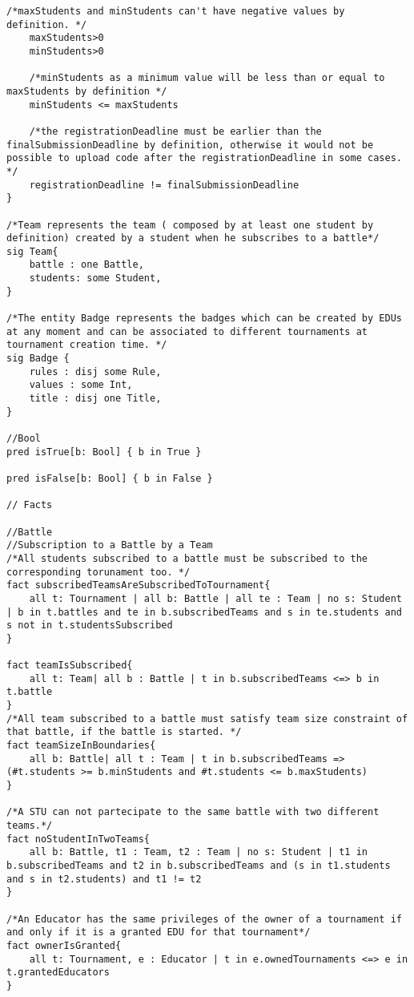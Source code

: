 \begin{lstlisting}[language=Alloy,  label={lst:alloycode}, basicstyle=\fontfamily{Roboto}\selectfont\ttfamily]
    /*maxStudents and minStudents can't have negative values by definition. */
    maxStudents>0
    minStudents>0 
    
    /*minStudents as a minimum value will be less than or equal to maxStudents by definition */
    minStudents <= maxStudents
    
    /*the registrationDeadline must be earlier than the finalSubmissionDeadline by definition, otherwise it would not be possible to upload code after the registrationDeadline in some cases. */
    registrationDeadline != finalSubmissionDeadline 
}

/*Team represents the team ( composed by at least one student by definition) created by a student when he subscribes to a battle*/
sig Team{
    battle : one Battle,
    students: some Student,
}

/*The entity Badge represents the badges which can be created by EDUs at any moment and can be associated to different tournaments at tournament creation time. */
sig Badge {
    rules : disj some Rule,
    values : some Int,
    title : disj one Title,
}

//Bool
pred isTrue[b: Bool] { b in True }

pred isFalse[b: Bool] { b in False }
    
// Facts

//Battle
//Subscription to a Battle by a Team
/*All students subscribed to a battle must be subscribed to the corresponding torunament too. */
fact subscribedTeamsAreSubscribedToTournament{
    all t: Tournament | all b: Battle | all te : Team | no s: Student | b in t.battles and te in b.subscribedTeams and s in te.students and s not in t.studentsSubscribed
}

fact teamIsSubscribed{
	all t: Team| all b : Battle | t in b.subscribedTeams <=> b in t.battle
}
/*All team subscribed to a battle must satisfy team size constraint of that battle, if the battle is started. */
fact teamSizeInBoundaries{
    all b: Battle| all t : Team | t in b.subscribedTeams => (#t.students >= b.minStudents and #t.students <= b.maxStudents)
}    

/*A STU can not partecipate to the same battle with two different teams.*/
fact noStudentInTwoTeams{
    all b: Battle, t1 : Team, t2 : Team | no s: Student | t1 in b.subscribedTeams and t2 in b.subscribedTeams and (s in t1.students and s in t2.students) and t1 != t2
}
    
/*An Educator has the same privileges of the owner of a tournament if and only if it is a granted EDU for that tournament*/
fact ownerIsGranted{
    all t: Tournament, e : Educator | t in e.ownedTournaments <=> e in t.grantedEducators
}


\end{lstlisting}

